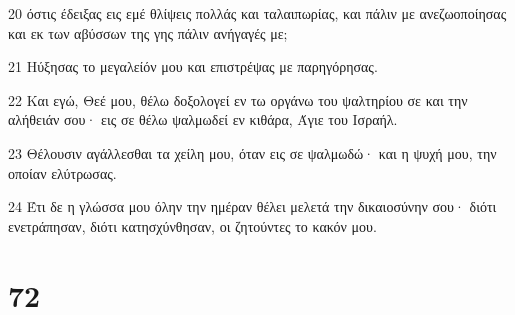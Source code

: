 \par 20 όστις έδειξας εις εμέ θλίψεις πολλάς και ταλαιπωρίας, και πάλιν με ανεζωοποίησας και εκ των αβύσσων της γης πάλιν ανήγαγές με;
\par 21 Ηύξησας το μεγαλείόν μου και επιστρέψας με παρηγόρησας.
\par 22 Και εγώ, Θεέ μου, θέλω δοξολογεί εν τω οργάνω του ψαλτηρίου σε και την αλήθειάν σου· εις σε θέλω ψαλμωδεί εν κιθάρα, Άγιε του Ισραήλ.
\par 23 Θέλουσιν αγάλλεσθαι τα χείλη μου, όταν εις σε ψαλμωδώ· και η ψυχή μου, την οποίαν ελύτρωσας.
\par 24 Έτι δε η γλώσσα μου όλην την ημέραν θέλει μελετά την δικαιοσύνην σου· διότι ενετράπησαν, διότι κατησχύνθησαν, οι ζητούντες το κακόν μου.

\chapter{72}

